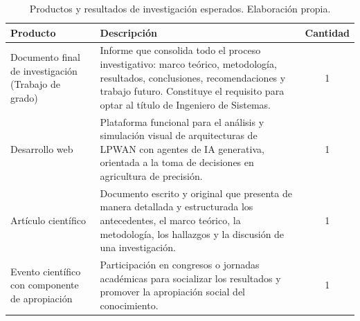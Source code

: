 \begin{table}[H]
    \centering
    \small
    \begin{tabularx}{\textwidth}{@{} >{\raggedright\arraybackslash}p{4cm} >{\raggedright\arraybackslash}X c @{}}
        \toprule
        \textbf{Producto}                                   & \textbf{Descripción}                                                                                                                                                                                                & \textbf{Cantidad} \\
        \midrule
        Documento final de investigación (Trabajo de grado) & Informe que consolida todo el proceso investigativo: marco teórico, metodología, resultados, conclusiones, recomendaciones y trabajo futuro. Constituye el requisito para optar al título de Ingeniero de Sistemas. & 1                 \\
        \addlinespace
        Desarrollo web                                      & Plataforma funcional para el análisis y simulación visual de arquitecturas de LPWAN con agentes de IA generativa, orientada a la toma de decisiones en agricultura de precisión.                                    & 1                 \\
        \addlinespace
        Artículo científico                                 & Documento escrito y original que presenta de manera detallada y estructurada los antecedentes, el marco teórico, la metodología, los hallazgos y la discusión de una investigación.                                 & 1                 \\
        \addlinespace
        Evento científico con componente de apropiación     & Participación en congresos o jornadas académicas para socializar los resultados y promover la apropiación social del conocimiento.                                                                                  & 1                 \\
        \bottomrule
    \end{tabularx}
    \caption{Productos y resultados de investigación esperados. Elaboración propia.}
    \label{tab:productos_completos}
\end{table}